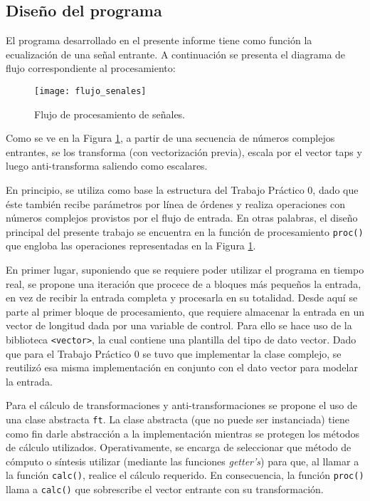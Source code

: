\subsection{Diseño del programa}

El programa desarrollado en el presente informe tiene como función la ecualización de una señal entrante. A continuación se presenta el diagrama de flujo correspondiente al procesamiento:

	\begin{figure}[h]
		\centering
			\texttt{[image: flujo\_senales]}
		\caption{Flujo de procesamiento de señales.}
		\label{fig:flujo_senales}
	\end{figure}

	Como se ve en la Figura \ref{fig:flujo_senales}, a partir de una secuencia de números complejos entrantes, se los transforma (con vectorización previa), escala por el vector taps y luego anti-transforma saliendo como escalares.

	En principio, se utiliza como base la estructura del Trabajo Práctico 0, dado que éste también recibe parámetros por línea de órdenes y realiza operaciones con números complejos provistos por el flujo de entrada. En otras palabras, el diseño principal del presente trabajo se encuentra en la función de procesamiento \texttt{proc()} que engloba las operaciones representadas en la Figura \ref{fig:flujo_senales}.

	En primer lugar, suponiendo que se requiere poder utilizar el programa en tiempo real, se propone una iteración que procece de a bloques más pequeños la entrada, en vez de recibir la entrada completa y procesarla en su totalidad. Desde aquí se parte al primer bloque de procesamiento, que requiere almacenar la entrada en un vector de longitud dada por una variable de control. Para ello se hace uso de la biblioteca \texttt{<vector>}, la cual contiene una plantilla del tipo de dato vector. Dado que para el Trabajo Práctico 0 se tuvo que implementar la clase complejo, se reutilizó esa misma implementación en conjunto con el dato vector para modelar la entrada.

	Para el cálculo de transformaciones y anti-transformaciones se propone el uso de una clase abstracta \texttt{ft}. La clase abstracta (que no puede ser instanciada) tiene como fin darle abstracción a la implementación mientras se protegen los métodos de cálculo utilizados. Operativamente, se encarga de seleccionar que método de cómputo o síntesis utilizar (mediante las funciones \emph{getter's}) para que, al llamar a la función \texttt{calc()}, realice el cálculo requerido. En consecuencia, la función \texttt{proc()} llama a \texttt{calc()} que sobrescribe el vector entrante con su transformación.

